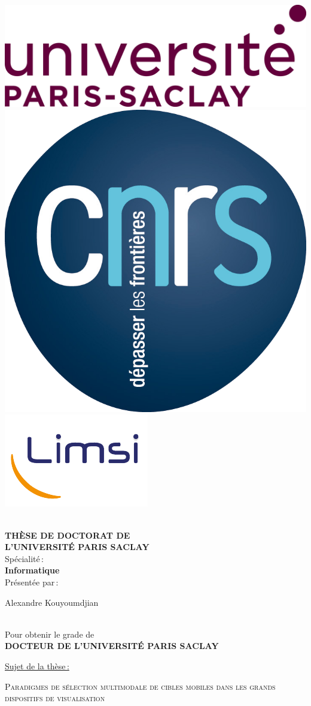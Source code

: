 \begin{titlepage}

\includegraphics[height=2.cm]{./figures/garde/logo_paris_saclay}\hfill
\includegraphics[height=2.cm]{./figures/garde/logo_CNRS}\hfill
\includegraphics[height=2.cm]{./figures/garde/limsilogo_new_transparent_crop}\hfill
\\
\\



\begin{center}
 \textbf{THÈSE DE DOCTORAT DE\\ L'UNIVERSITÉ PARIS SACLAY\\}
Spécialité\,:\\
\textbf{Informatique}\\ 
Présentée par\,:\\ 
\begin{LARGE}
Alexandre Kouyoumdjian\end{LARGE}\\
Pour obtenir le grade de\\
\textbf{DOCTEUR DE L'UNIVERSITÉ PARIS SACLAY}
\end{center}

\noindent \underline{Sujet de la thèse\,: }\\
\begin{center}
\begin{Large}
{\textsc{Paradigmes de sélection multimodale de cibles mobiles dans les grands dispositifs de visualisation}}
\end{Large}
\end{center}


\end{titlepage}
